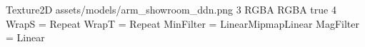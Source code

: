 Texture2D
assets/models/arm_showroom_ddn.png
3
RGBA
RGBA
true
4
WrapS = Repeat
WrapT = Repeat
MinFilter = LinearMipmapLinear
MagFilter = Linear
